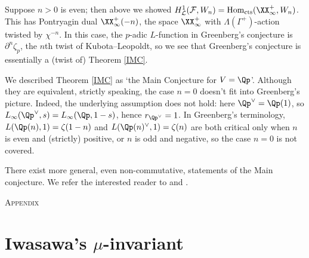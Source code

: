 \documentclass[a4paper,10pt, english, reqno]{smfart}
\newcommand{\cF}{\mathcal{F}}
\numberwithin{equation}{section}
\begin{document}
\begin{example}\label{ex:greenberg general 2}
Suppose $n>0$ is even; then above we showed $H^1_{\mathcal{L}}(\cF,W_n) = \mathrm{Hom}_{\mathrm{cts}}(\XX_\infty^+,W_n)$. This has Pontryagin dual $\XX_\infty^+(-n)$, the space $\XX_\infty^+$ with $\Lambda(\Gamma^+)$-action twisted by $\chi^{-n}$. In this case, the $p$-adic $L$-function in Greenberg's conjecture is $\partial^n\zeta_p$, the $n$th twist of Kubota--Leopoldt, so we see that Greenberg's conjecture is essentially a (twist of) Theorem \ref{IMC}.
\end{example}




\begin{remark}\label{rem:greenberg general 2}
We described Theorem \ref{IMC} as `the Main Conjecture for $V = \Qp$'. Although they are equivalent, strictly speaking, the case $n = 0$ doesn't fit into Greenberg's picture. Indeed, the underlying assumption does not hold: here $\Qp^\vee = \Qp(1)$, so $L_\infty(\Qp^\vee,s) = L_\infty(\Qp,1-s)$, hence $r_{\Qp^\vee} = 1$. In Greenberg's terminology, $L(\Qp(n),1) = \zeta(1-n)$ and $L(\Qp(n)^\vee,1) = \zeta(n)$ are both critical only when $n$ is even and (strictly) positive, or $n$ is odd and negative, so the case $n = 0$ is not covered. %
\end{remark}



\begin{remark}
There exist more general, even non-commutative, statements of the Main conjecture. We refer the interested reader to \cite{KatoIwasawa} and \cite{FukayaKato}.
\end{remark}






\vspace{15pt}
\newpage

\appendix
\begin{center}\scshape{{\LARGE Appendix}}\\
\end{center}

\vspace{-10pt}


\section{Iwasawa's $\mu$-invariant}\label{sec:mu invariant}
\end{document}
